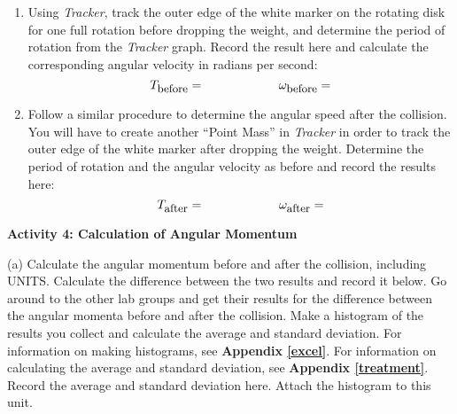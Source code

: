 \begin{enumerate}
\item Using \textit{Tracker}, track the outer edge of the white marker on the rotating disk 
for one full rotation before dropping the weight, and determine the period of rotation from the 
\textit{Tracker} graph. Record the result here and calculate the corresponding angular velocity 
in radians per second:
\[
T_{\mbox{\small before}}=\qquad \qquad \qquad \omega _{\mbox{\small before}}=\]
\vspace{5mm}
\item Follow a similar procedure to determine the angular speed after the collision. You will have 
to create another ``Point Mass'' in \textit{Tracker} in order to track the outer edge of the white 
marker after dropping the weight. Determine the period of rotation and the angular velocity as 
before and record the results here:
\[
T_{\mbox{\small after}}=\qquad \qquad \qquad \omega _{\mbox{\small after}}=\]

\end{enumerate}
\vspace{10mm}
\pagebreak[2]
\textbf{Activity 4: Calculation of Angular Momentum}

(a) Calculate the angular momentum before and after the collision, including UNITS. Calculate the difference between the two results and record it below. 
Go around to the other lab groups and get their results for the difference between the angular momenta before and after the collision.
Make a histogram of the results you collect and calculate the average and standard deviation.
For information on making histograms, see \textbf{Appendix \ref{excel}}. For information on calculating the average and standard deviation, see \textbf{Appendix \ref{treatment}}. 
Record the average and standard deviation here. Attach the histogram to this unit.
\vspace{5mm}

